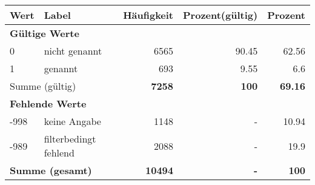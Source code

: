      \begin{longtable}{lXrrr}
     \toprule
     \textbf{Wert} & \textbf{Label} & \textbf{Häufigkeit} & \textbf{Prozent(gültig)} & \textbf{Prozent} \\
     \endhead
     \midrule
     \multicolumn{5}{l}{\textbf{Gültige Werte}}\\

     0 &
     \multicolumn{1}{X}{ nicht genannt   } &


       \num{6565} &
       \num[round-mode=places,round-precision=2]{90,45} &
         \num[round-mode=places,round-precision=2]{62,56} \\

     1 &
     \multicolumn{1}{X}{ genannt   } &


       \num{693} &
       \num[round-mode=places,round-precision=2]{9,55} &
         \num[round-mode=places,round-precision=2]{6,6} \\
     \midrule
     \multicolumn{2}{l}{Summe (gültig)} &
       \textbf{\num{7258}} &
     \textbf{100} &
       \textbf{\num[round-mode=places,round-precision=2]{69,16}} \\
     \multicolumn{5}{l}{\textbf{Fehlende Werte}}\\
       -998 &
       keine Angabe &
         \num{1148} &
        - &
         \num[round-mode=places,round-precision=2]{10,94} \\
       -989 &
       filterbedingt fehlend &
         \num{2088} &
        - &
         \num[round-mode=places,round-precision=2]{19,9} \\
     \midrule
     \multicolumn{2}{l}{\textbf{Summe (gesamt)}} &
          \textbf{\num{10494}} &
        \textbf{-} &
        \textbf{100} \\
     \bottomrule
     \end{longtable}
     
